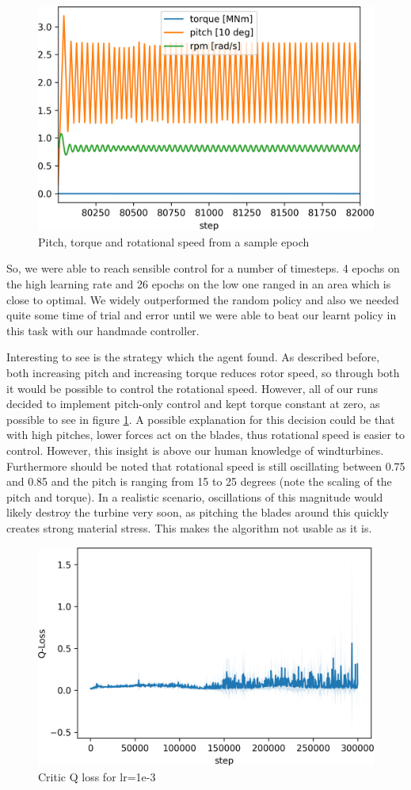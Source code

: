 \documentclass[hyperref,final,beleg]{cgvpub}
\begin{document}
\begin{figure}
  \centering
  \includegraphics[width=0.5\linewidth]{images/epoch40.png}
  \caption{Pitch, torque and rotational speed from a sample epoch}
  \label{fig:strategy}
\end{figure}

So, we were able to reach sensible control for a number of timesteps. 4 epochs on the high learning rate and 26 epochs on the low one ranged in an area which is close to optimal. We widely outperformed the random policy and also we needed quite some time of trial and error until we were able to beat our learnt policy in this task with our handmade controller.

Interesting to see is the strategy which the agent found. As described before, both increasing pitch and increasing torque reduces rotor speed, so through both it would be possible to control the rotational speed. However, all of our runs decided to implement pitch-only control and kept torque constant at zero, as possible to see in figure \ref{fig:strategy}. A possible explanation for this decision could be that with high pitches, lower forces act on the blades, thus rotational speed is easier to control. However, this insight is above our human knowledge of windturbines. Furthermore should be noted that rotational speed is still oscillating between 0.75 and 0.85 and the pitch is ranging from 15 to 25 degrees (note the scaling of the pitch and torque). In a realistic scenario, oscillations of this magnitude would likely destroy the turbine very soon, as pitching the blades around this quickly creates strong material stress. This makes the algorithm not usable as it is.

\begin{figure}
  \centering
  \includegraphics[width=0.5\linewidth]{images/plot_critic_1e-3_qloss.png}
  \caption{Critic Q loss for lr=1e-3}
  \label{fig:critic_qloss}
\end{figure}
\end{document}
